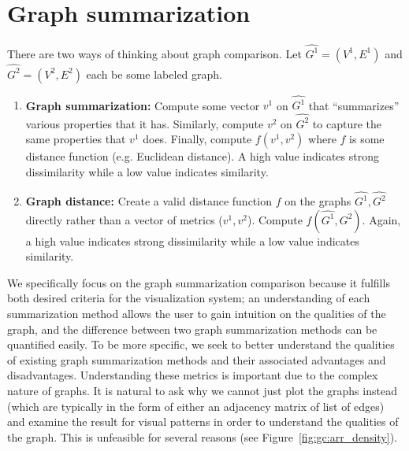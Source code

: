\section{Graph summarization}
\label{sec:gc:litreview}

There are two ways of thinking about graph comparison. Let 
$\hat{G^1}=(V^1,E^1)$ and $\hat{G^2}=(V^2,E^2)$ each be some labeled graph. 

\tablespacing
\begin{enumerate}
	\item \textbf{Graph summarization:} Compute some vector 
	$v^1$ on $\hat{G^1}$ that ``summarizes'' various properties that
	it has. Similarly, compute $v^2$ on $\hat{G^2}$ to capture 
	the same properties that $v^1$ does. Finally, compute 
	$f(v^1,v^2)$ where $f$ is some distance 
	function (e.g. Euclidean distance). A high value indicates strong 
	dissimilarity while a low value indicates similarity. 
	
	\item \textbf{Graph distance:} Create a valid distance function $f$ on the 
	graphs $\hat{G^1}, \hat{G^2}$ directly rather than a vector of metrics 
	($v^1,v^2$). 
	Compute $f(\hat{G^1},\hat{G^2})$. Again, a high value indicates strong 
	dissimilarity while a low value indicates similarity. 
\end{enumerate}
\bodyspacing

We specifically focus on the graph summarization comparison because it 
fulfills both desired criteria for the visualization system; an understanding 
of each summarization method allows the user to gain intuition on the qualities 
of the graph, and the difference between two graph summarization methods can be 
quantified easily. To be more specific, we seek to better understand the 
qualities of existing graph summarization methods and their associated 
advantages and disadvantages. 
Understanding these metrics is important due to the complex nature of graphs.
It is natural to ask why we cannot just plot the graphs instead (which are 
typically in the form of either an adjacency matrix of list of edges) and 
examine the result for visual patterns in order to understand the qualities 
of the graph. This is unfeasible for several reasons (see 
Figure~\ref{fig:gc:arr_density}). 

